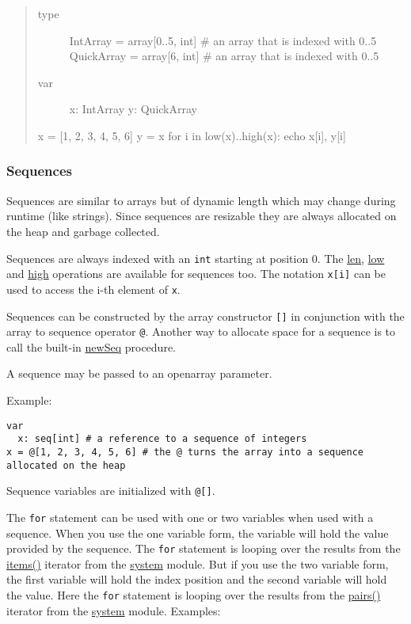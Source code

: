 \begin{verbatim}
\end{verbatim}

\begin{quote}
\begin{description}
\item[type]
IntArray = array{[}0..5, int{]} \# an array that is indexed with 0..5
QuickArray = array{[}6, int{]} \# an array that is indexed with 0..5
\item[var]
x: IntArray y: QuickArray
\end{description}

x = {[}1, 2, 3, 4, 5, 6{]} y = x for i in low(x)..high(x): echo
x{[}i{]}, y{[}i{]}
\end{quote}

\hypertarget{sequences}{%
\subsubsection{Sequences}\label{sequences}}

Sequences are similar to arrays but of dynamic length which may change
during runtime (like strings). Since sequences are resizable they are
always allocated on the heap and garbage collected.

Sequences are always indexed with an \texttt{int} starting at position
0. The \href{system.html\#len,seq\%5BT\%5D}{len},
\href{system.html\#low,openArray\%5BT\%5D}{low} and
\href{system.html\#high,openArray\%5BT\%5D}{high} operations are
available for sequences too. The notation \texttt{x{[}i{]}} can be used
to access the i-th element of \texttt{x}.

Sequences can be constructed by the array constructor \texttt{{[}{]}} in
conjunction with the array to sequence operator \texttt{@}. Another way
to allocate space for a sequence is to call the built-in
\href{system.html\#newSeq}{newSeq} procedure.

A sequence may be passed to an openarray parameter.

Example:

\begin{verbatim}
var
  x: seq[int] # a reference to a sequence of integers
x = @[1, 2, 3, 4, 5, 6] # the @ turns the array into a sequence allocated on the heap
\end{verbatim}

Sequence variables are initialized with \texttt{@{[}{]}}.

The \texttt{for} statement can be used with one or two variables when
used with a sequence. When you use the one variable form, the variable
will hold the value provided by the sequence. The \texttt{for} statement
is looping over the results from the
\href{system.html\#items.i,seq\%5BT\%5D}{items()} iterator from the
\href{system.html}{system} module. But if you use the two variable form,
the first variable will hold the index position and the second variable
will hold the value. Here the \texttt{for} statement is looping over the
results from the \href{system.html\#pairs.i,seq\%5BT\%5D}{pairs()}
iterator from the \href{system.html}{system} module. Examples:

